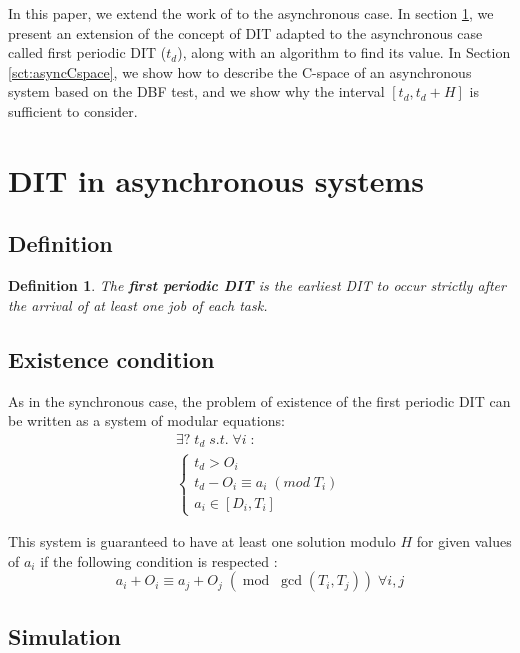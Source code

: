 \documentclass[times, 10pt,twocolumn, a4paper]{article}
\newtheorem{definition}{Definition}
\begin{document}
  In this paper, we extend the work of \cite{george2009characterization} to the asynchronous case. In section \ref{sct:asyncDIT}, we present an extension of the concept of DIT adapted to the asynchronous case called first periodic DIT ($t_d$), along with an algorithm to find its value. In Section \ref{sct:asyncCspace}, we show how to describe the C-space of an asynchronous system based on the DBF test, and we show why the interval $[t_d, t_d + H]$ is sufficient to consider.

\section{DIT in asynchronous systems}
	\label{sct:asyncDIT}

	\subsection{Definition}

\begin{definition}
	The \textbf{first periodic DIT} is the earliest DIT to occur strictly after the
	arrival of at least one job of each task.
\end{definition}

\subsection{Existence condition}
	As in the synchronous case, the problem of existence of the first periodic DIT
	can be written as a system of modular equations:
	\[
		\begin{array}{l}
			\exists ? \; t_d \; s.t. \; \forall i \; :\\
			\left\{
				\begin{array}{l}
					t_d > O_i \\
					t_d - O_i \equiv a_i \; (mod \; T_i) \\
					a_i \in [D_i, T_i]
				\end{array}
			\right.
		\end{array}
	\]
	
	This system is guaranteed to have at least one solution modulo $H$ for given
	values of $a_i$ if the following condition is respected :
	\[
		a_i + O_i \equiv a_j + O_j \; (\operatorname{mod} \; \operatorname{gcd}(T_i,
		T_j)) \; \forall i,j
	\]

  \subsection{Simulation}
\end{document}
